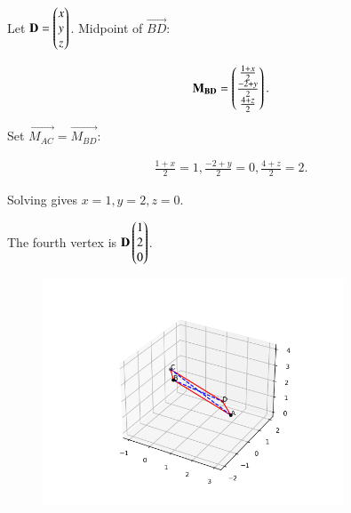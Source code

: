 \documentclass[journal]{IEEEtran}
\begin{document}
Let $\mathbf{D}=\begin{pmatrix}x\\y\\z\end{pmatrix}$. Midpoint of $\vec{BD}$:

\begin{align}
\mathbf{M_{BD}}=\begin{pmatrix}\frac{1+x}{2} \\ \frac{-2+y}{2} \\ \frac{4+z}{2}\end{pmatrix}.
\end{align}

Set $\vec{M_{AC}}=\vec{M_{BD}}$:

\begin{align}
\frac{1+x}{2}=1, \frac{-2+y}{2}=0, \frac{4+z}{2}=2.
\end{align}

Solving gives $x=1, y=2, z=0$.

The fourth vertex is $\mathbf{D}\begin{pmatrix}1\\2\\0\end{pmatrix}$.

\begin{figure}[H]
    \centering
    \includegraphics[width=0.8\textwidth]{figs/Fig 1.png}
    \caption{}
    \label{fig:Parallelogram}
\end{figure}
\end{document}
